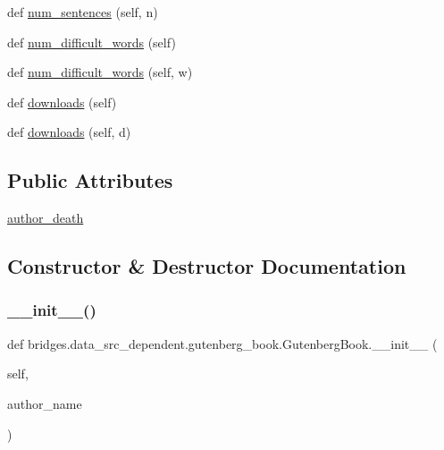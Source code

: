 \begin{DoxyCompactItemize}
def \mbox{\hyperlink{classbridges_1_1data__src__dependent_1_1gutenberg__book_1_1_gutenberg_book_a38ca770a1e4f460f3b73a1d50e1f52f8}{num\+\_\+sentences}} (self, n)
\item 
def \mbox{\hyperlink{classbridges_1_1data__src__dependent_1_1gutenberg__book_1_1_gutenberg_book_a5f616c4e018f44da77a861db528103fa}{num\+\_\+difficult\+\_\+words}} (self)
\item 
def \mbox{\hyperlink{classbridges_1_1data__src__dependent_1_1gutenberg__book_1_1_gutenberg_book_aceaae959361c8c9c2f2cddf7fa71e5eb}{num\+\_\+difficult\+\_\+words}} (self, w)
\item 
def \mbox{\hyperlink{classbridges_1_1data__src__dependent_1_1gutenberg__book_1_1_gutenberg_book_afb28a5f09f09aea1397d32bf075d847a}{downloads}} (self)
\item 
def \mbox{\hyperlink{classbridges_1_1data__src__dependent_1_1gutenberg__book_1_1_gutenberg_book_a5fe07e62aae174ef3c862f3f5ad7f6e6}{downloads}} (self, d)
\end{DoxyCompactItemize}
\subsection*{Public Attributes}
\begin{DoxyCompactItemize}
\item 
\mbox{\hyperlink{classbridges_1_1data__src__dependent_1_1gutenberg__book_1_1_gutenberg_book_afd78a02948accf9b270e7b9cb9e38856}{author\+\_\+death}}
\end{DoxyCompactItemize}


\subsection{Constructor \& Destructor Documentation}
\mbox{\label{classbridges_1_1data__src__dependent_1_1gutenberg__book_1_1_gutenberg_book_ac44f922d6f63fc6ab3c0788ea9b9c4b5}} 
\subsubsection{\texorpdfstring{\+\_\+\+\_\+init\+\_\+\+\_\+()}{\_\_init\_\_()}}
{\footnotesize\ttfamily def bridges.\+data\+\_\+src\+\_\+dependent.\+gutenberg\+\_\+book.\+Gutenberg\+Book.\+\_\+\+\_\+init\+\_\+\+\_\+ (\begin{DoxyParamCaption}\item[{}]{self,  }\item[{}]{author\+\_\+name }\end{DoxyParamCaption})}



